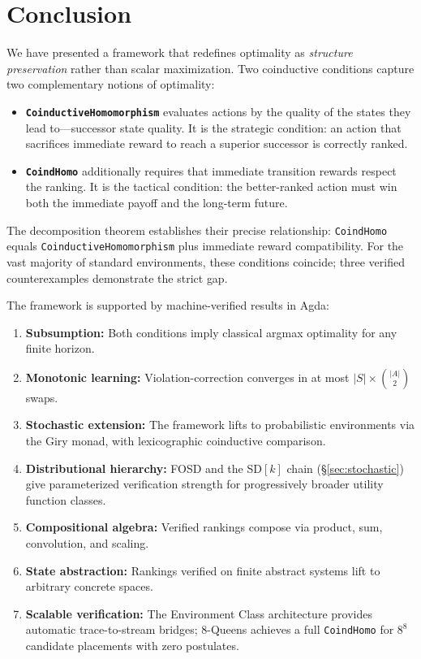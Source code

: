 \documentclass[runningheads]{llncs}
\begin{document}
\section{Conclusion}

We have presented a framework that redefines optimality as \emph{structure preservation} rather than scalar maximization.  Two coinductive conditions capture two complementary notions of optimality:

\begin{itemize}
\item \textbf{\texttt{CoinductiveHomomorphism}} evaluates actions by the quality of the states they lead to---successor state quality.  It is the strategic condition: an action that sacrifices immediate reward to reach a superior successor is correctly ranked.

\item \textbf{\texttt{CoindHomo}} additionally requires that immediate transition rewards respect the ranking.  It is the tactical condition: the better-ranked action must win both the immediate payoff and the long-term future.
\end{itemize}

\noindent The decomposition theorem establishes their precise relationship: \texttt{CoindHomo} equals \texttt{CoinductiveHomomorphism} plus immediate reward compatibility.  For the vast majority of standard environments, these conditions coincide; three verified counterexamples demonstrate the strict gap.

The framework is supported by machine-verified results in Agda:
\begin{enumerate}
\item \textbf{Subsumption:} Both conditions imply classical argmax optimality for any finite horizon.
\item \textbf{Monotonic learning:} Violation-correction converges in at most $|S| \times \binom{|A|}{2}$ swaps.
\item \textbf{Stochastic extension:} The framework lifts to probabilistic environments via the Giry monad, with lexicographic coinductive comparison.
\item \textbf{Distributional hierarchy:} FOSD and the SD$[k]$ chain (\S\ref{sec:stochastic}) give parameterized verification strength for progressively broader utility function classes.
\item \textbf{Compositional algebra:} Verified rankings compose via product, sum, convolution, and scaling.
\item \textbf{State abstraction:} Rankings verified on finite abstract systems lift to arbitrary concrete spaces.
\item \textbf{Scalable verification:} The Environment Class architecture provides automatic trace-to-stream bridges; 8-Queens achieves a full \texttt{CoindHomo} for $8^8$ candidate placements with zero postulates.
\end{enumerate}
\end{document}
